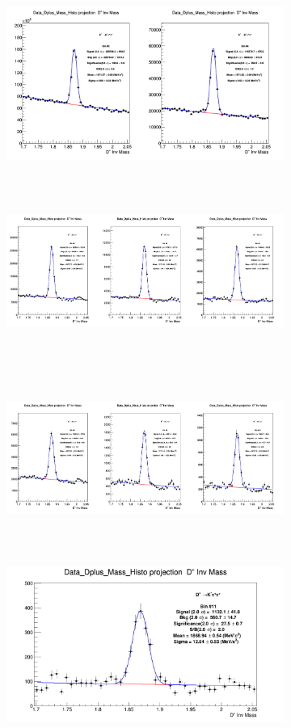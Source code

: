 \begin{enumerate}
\begin{figure}
\begin{enumerate}
\begin{figure}[!htp]
\centering
{\includegraphics[width=1\linewidth, height=6cm]{figures/DplusPlotsweff/InvMassDistributions_Dplus_Bins3to4.png}}
{\includegraphics[width=1\linewidth, height=6cm]{figures/DplusPlotsweff/InvMassDistributions_Dplus_Bins5to7.png}}
{\includegraphics[width=1\linewidth, height=6cm]{figures/DplusPlotsweff/InvMassDistributions_Dplus_Bins8to10.png}}
{\includegraphics[width=1\linewidth, height=6cm]{figures/DplusPlotsweff/InvMassDistributions_Dplus_Bins11to11.png}}


\end{figure}
\end{enumerate}
\end{figure}
\end{enumerate}
